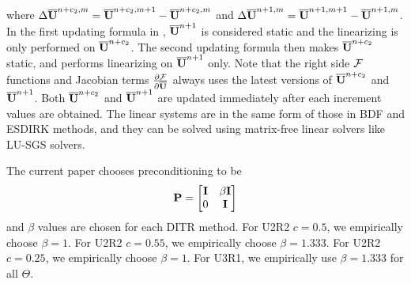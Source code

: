 where $\mathrm\Delta \overline{\mathbf{U}}^{n+c_2,m} = \overline{\mathbf{U}}^{n+c_2,m+1} - \overline{\mathbf{U}}^{n+c_2,m}$ and
$\mathrm\Delta \overline{\mathbf{U}}^{n+1,m} = \overline{\mathbf{U}}^{n+1,m+1} - \overline{\mathbf{U}}^{n+1,m}$.
In the first updating formula in ,
$\overline{\mathbf{U}}^{n+1}$ is considered static and the linearizing is only
performed on $\overline{\mathbf{U}}^{n+c_2}$. The second updating formula
then makes $\overline{\mathbf{U}}^{n+c_2}$ static, and performs linearizing on
$\overline{\mathbf{U}}^{n+1}$ only. Note that the right side $\mathcal{F}$ functions
and Jacobian terms $\partialderivative{\FF}{\uu}$ always
uses the latest versions of $\overline{\mathbf{U}}^{n+c_2}$ and $\overline{\mathbf{U}}^{n+1}$.
Both $\overline{\mathbf{U}}^{n+c_2}$ and $\overline{\mathbf{U}}^{n+1}$ are updated immediately
after each increment values are obtained.
The linear systems are in the same form
of those in BDF and ESDIRK methods, and they
can be solved using matrix-free linear solvers like
LU-SGS solvers.

The current paper chooses preconditioning to be 
\begin{equation}
    \mathbf{P} = \begin{bmatrix}
        \mathbf{I} & \beta\mathbf{I} \\
        0    & \mathbf{I}
    \end{bmatrix}
    \label{eq:specialP}
\end{equation}
and $\beta$ values are chosen for each DITR method.
For U2R2 $c=0.5$, we empirically choose $\beta = 1$.
For U2R2 $c=0.55$, we empirically choose $\beta = 1.333$.
For U2R2 $c=0.25$, we empirically choose $\beta = 1$.
For U3R1, we empirically use $\beta = 1.333$ for all $\Theta$.









